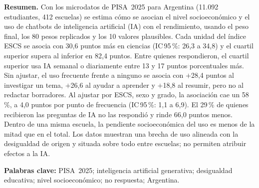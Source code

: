 \documentclass[11pt,a4paper]{article}
\newcommand{\ic}[2]{IC\,95\,\%: #1 a #2}
\begin{document}
\thispagestyle{plain}
\vspace*{-0.8cm}
\noindent{\color{azul}\rule{\textwidth}{1.2pt}}\par\vspace{0.45cm}
\vspace{0.3cm}
\vspace{0.4cm}
\par
\vspace{0.3cm}
\noindent{\color{azul}\rule{\textwidth}{0.4pt}}\par\vspace{0.35cm}

\noindent\small
\textbf{Resumen.} Con los microdatos de PISA~2025 para Argentina (11.092 estudiantes, 412 escuelas) se estima cómo se asocian el nivel socioeconómico y el uso de chatbots de inteligencia artificial (IA) con el rendimiento, usando el peso final, los 80 pesos replicados y los 10 valores plausibles. Cada unidad del índice ESCS se asocia con 30,6 puntos más en ciencias (\ic{26,3}{34,8}) y el cuartil superior supera al inferior en 82,4 puntos. Entre quienes respondieron, el cuartil superior usa IA semanal o diariamente entre 13 y 17 puntos porcentuales más. Sin ajustar, el uso frecuente frente a ninguno se asocia con $+$28,4 puntos al investigar un tema, $+$26,6 al ayudar a aprender y $+$18,8 al resumir, pero no al redactar borradores. Al ajustar por ESCS, sexo y grado, la asociación cae un 58\,\%, a 4,0 puntos por punto de frecuencia (\ic{1,1}{6,9}). El 29\,\% de quienes recibieron las preguntas de IA no las respondió y rinde 66,0 puntos menos. Dentro de una misma escuela, la pendiente socioeconómica del uso es menos de la mitad que en el total. Los datos muestran una brecha de uso alineada con la desigualdad de origen y situada sobre todo entre escuelas; no permiten atribuir efectos a la IA.

\smallskip\noindent\textbf{Palabras clave:} PISA~2025; inteligencia artificial generativa; desigualdad educativa; nivel socioeconómico; no respuesta; Argentina.

\par\normalsize
\vspace{0.25cm}\noindent{\color{azul}\rule{\textwidth}{0.4pt}}\par
\end{document}
